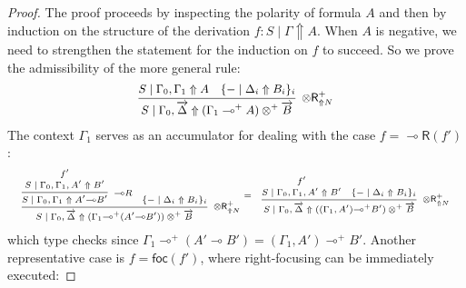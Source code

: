 \documentclass[runningheads]{llncs}
\renewcommand{\vec}{\overrightarrow}
\newcommand{\tr}{\otimes \mathsf{R}}
\newcommand{\lright}{{\multimap}\mathsf{R}}
\newcommand{\otR}{\tr}
\newcommand{\lolliR}{\lright}
\newcommand{\ot}{\otimes}
\newcommand{\lolli}{\multimap}
\newcommand{\proofbox}[1]{\begin{tabular}{l} #1 \end{tabular}}
\newcommand{\up}{\Uparrow}
\newcommand{\dn}{\Downarrow}
\newcommand{\foc}{\mathsf{foc}}
\newcommand{\focR}{\mathsf{foc_R}}
\newcommand{\blurR}{\mathsf{blur_R}}
\begin{document}
\begin{proof}
  The proof proceeds by inspecting the polarity of formula $A$ and then by induction on the structure of the derivation $f : S \mid \Gamma \up A$. When $A$ is negative, we need to strengthen the statement for the induction on $f$ to succeed. So we prove the admissibility of the more general rule:
  \begin{equation*}
    \label{eq:genotR}
    \footnotesize
    \begin{array}{c}
      \infer[\otR^+_{\up N}]{S \mid \Gamma_0 , \vec{\Delta} \up (\Gamma_1 \lolli^+ A) \ot^+ \vec{B}}{
      S \mid \Gamma_0,\Gamma_1 \up A
      &
      \{ - \mid \Delta_i \up B_i \}_{i}
      }
    \end{array}
  \end{equation*}
  The context $\Gamma_1$ serves as an accumulator for dealing with the case $f = \lolliR(f')$:
  \begin{equation*}\label{eq:otRlolliR}
  \scriptsize
  \begin{array}{c}
    \proofbox{\infer[\otR^+_{\up N}]{S \mid \Gamma_0 , \vec{\Delta} \up (\Gamma_1 {\lolli}^+ (A' {\lolli} B')) \ot^+ \vec{B}}{
      \infer[{\lolli}R]{S \mid \Gamma_0,\Gamma_1\up A' {\lolli} B'}{
        \deduce{S \mid \Gamma_0,\Gamma_1,A'\up B'}{f'}
        }
      &
      \{ - \mid \Delta_i \up B_i \}_{i}
    }} \!\!\!\! =
    \proofbox{
    \infer[\otR^+_{\up N}]{S \mid \Gamma_0 , \vec{\Delta} \up ((\Gamma_1,A') {\lolli}^+ B') \ot^+ \vec{B}}{
      \deduce{S \mid \Gamma_0,\Gamma_1,A' \up B'}{f'}
      & 
      \{ - \mid \Delta_i \up B_i \}_{i}
    }
    }
  \end{array}
  \end{equation*}
  which type checks since $\Gamma_1 {\lolli}^+ (A' {\lolli} B') = (\Gamma_1,A') {\lolli}^+ B'$.
  Another representative case is $f = \foc(f')$, where right-focusing can be immediately executed:

\end{proof}
\end{document}
